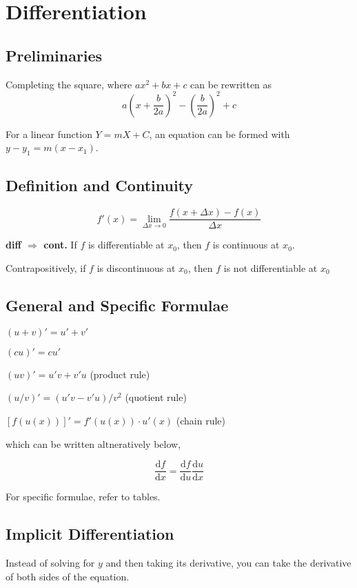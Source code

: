 
\section{Differentiation}

\subsection*{Preliminaries}

Completing the square, where $ax^2 + bx + c$ can be rewritten as
\begin{equation*}
  a\left(x + \frac{b}{2a}\right)^2 - \left(\frac{b}{2a}\right)^2 + c
\end{equation*}


For a linear function $Y = mX + C$, an equation can be formed with $y - y_1 = m(x - x_1)$.

\subsection*{Definition and Continuity}
\begin{equation*}
  f'(x) = \lim_{\Delta x \rightarrow 0} \frac{f(x + \Delta x) - f(x)}{\Delta x}
\end{equation*}

\textbf{diff $\Rightarrow$ cont. }If $f$ is differentiable at $x_0$, then $f$ is continuous at $x_0$. 

Contrapositively, if $f$ is discontinuous at $x_0$, then $f$ is not differentiable at $x_0$

\subsection*{General and Specific Formulae}

$(u + v)' = u' + v'$

$(cu)' = cu'$

$(uv)' = u'v + v'u$ (product rule)

$(u/v)' = (u'v - v'u) / v^2$ (quotient rule)

$[f(u(x))]' = f'(u(x)) \cdot u'(x)$ (chain rule)

which can be written altneratively below,

$$\frac{\mathrm{d}f}{\mathrm{d}x} = \frac{\mathrm{d}f}{\mathrm{d}u} \frac{\mathrm{d}u}{\mathrm{d}x}$$

For specific formulae, refer to tables.

\subsection*{Implicit Differentiation}
Instead of solving for $y$ and then taking its derivative, you can take the derivative of both sides of the equation.

